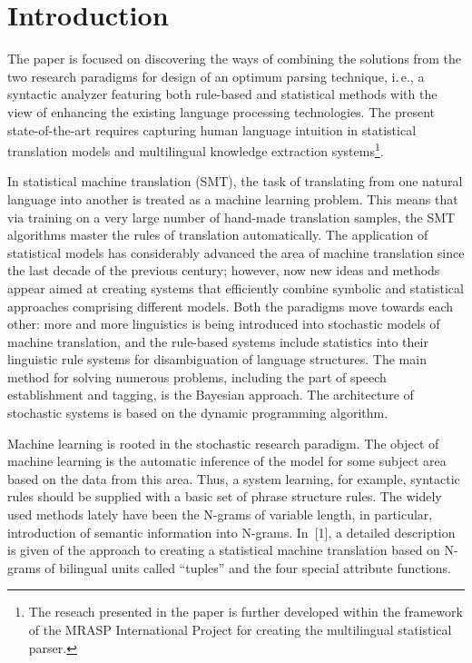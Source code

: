       \begin{multicols}{2}

      \label{st\stat}

    
\section{Introduction}

     \noindent
     The paper is focused on discovering the ways of combining the solutions 
from the two research paradigms for design of an optimum parsing technique, i.\,e., 
a syntactic analyzer featuring both rule-based and statistical methods with the view 
of enhancing the existing language processing technologies.  The present 
state-of-the-art requires capturing human language intuition in statistical translation models 
and multilingual knowledge extraction systems\footnote[3]{ The reseach presented in the 
paper is further developed within the framework of the MRASP International Project for creating 
the multilingual statistical parser.}.
     
     In statistical machine translation (SMT), the task of translating from one 
natural language into another is treated as a machine learning problem. This means 
that via training on a very large number of hand-made translation samples, the SMT 
algorithms master the rules of translation automatically. The application of 
statistical models has considerably advanced the area of machine translation since 
the last decade of the previous century; however, now new ideas and methods 
appear aimed at creating systems that efficiently combine symbolic and statistical 
approaches comprising different models.   Both the paradigms move towards each 
other: more and more linguistics is being introduced into stochastic   models of 
machine translation, and the rule-based systems include statistics into their 
linguistic rule systems for disambiguation of language structures.  The main 
method for solving numerous problems, including the part of speech establishment 
and tagging, is the Bayesian approach. The architecture of stochastic systems is 
based on the dynamic programming algorithm. 
     
     Machine learning is rooted in the stochastic research paradigm.  The object 
of machine learning is the automatic inference of the model for some subject area 
based on the data from this area. Thus, a system learning, for example, syntactic 
rules should be supplied with a basic set of phrase structure rules. The widely used 
methods lately have been the N-grams of variable length, in particular, introduction 
of semantic information into N-grams. In~[1], a detailed description is given of the 
approach to creating a statistical machine translation based on N-grams of bilingual 
units called ``tuples'' and the four special attribute functions.  
     

\end{multicols}
